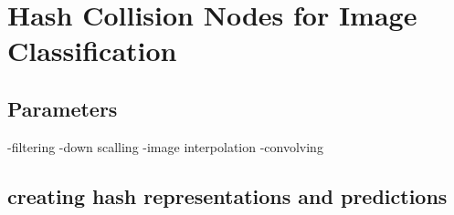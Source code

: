 \chapter{Hash Collision Nodes for Image Classification}

\section{Parameters}
-filtering
-down scalling
-image interpolation
-convolving

\section{creating hash representations and predictions}


